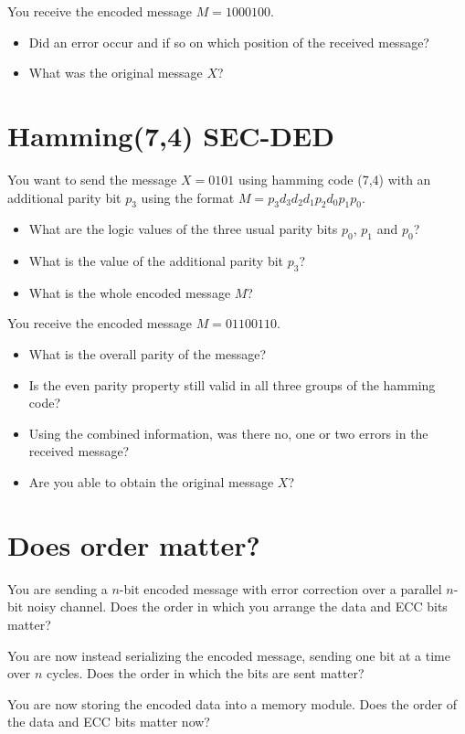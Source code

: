 \documentclass[a4paper]{article}
\begin{document}
\noindent You receive the encoded message $M=1000100$.
\begin{itemize}
    \item Did an error occur and if so on which position of the received message?
    \item What was the original message $X$?
\end{itemize}

\section{Hamming(7,4) SEC-DED}

You want to send the message $X=0101$ using hamming code (7,4) with an additional parity bit $p_3$ using the format $M=p_3d_3d_2d_1p_2d_0p_1p_0$.
\begin{itemize}
    \item What are the logic values of the three usual parity bits $p_0$, $p_1$ and $p_0$?
    \item What is the value of the additional parity bit $p_3$?
    \item What is the whole encoded message $M$?
\end{itemize}

\noindent You receive the encoded message $M=01100110$.
\begin{itemize}
    \item What is the overall parity of the message?
    \item Is the even parity property still valid in all three groups of the hamming code?
    \item Using the combined information, was there no, one or two errors in the received message?
    \item Are you able to obtain the original message $X$?
\end{itemize}

\section{Does order matter?}
You are sending a $n$-bit encoded message with error correction over a parallel $n$-bit noisy channel. 
Does the order in which you arrange the data and ECC bits matter?

You are now instead serializing the encoded message, sending one bit at a time over $n$ cycles. 
Does the order in which the bits are sent matter?

You are now storing the encoded data into a memory module. Does the order of the data and ECC bits matter now?
\end{document}
